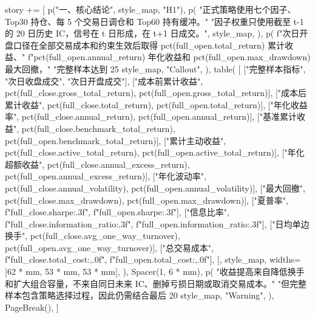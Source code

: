 \documentclass[UTF8,a4paper,fontset=fandol]{ctexart}
\begin{document}
\begin{ProjectCode}
    story += [
        p("一、核心结论", style_map, "H1"),
        p(
            "正式策略使用七个因子、Top30 持仓、每 5 个交易日调仓和 Top60 持有缓冲。"
            "因子权重只使用截至 t-1 的 20 日历史 IC，信号在 t 日形成，在 t+1 日成交。",
            style_map,
        ),
        p(
            f"次日开盘口径在全部交易成本和约束生效后取得 {pct(full_open.total_return)} 累计收益、"
            f"{pct(full_open.annual_return)} 年化收益和 {pct(full_open.max_drawdown)} 最大回撤，"
            "完整样本达到 25%
            style_map,
            "Callout",
        ),
        table(
            [
                ["完整样本指标", "次日收盘成交", "次日开盘成交"],
                ["成本前累计收益", pct(full_close.gross_total_return), pct(full_open.gross_total_return)],
                ["成本后累计收益", pct(full_close.total_return), pct(full_open.total_return)],
                ["年化收益率", pct(full_close.annual_return), pct(full_open.annual_return)],
                ["基准累计收益", pct(full_close.benchmark_total_return), pct(full_open.benchmark_total_return)],
                ["累计主动收益", pct(full_close.active_total_return), pct(full_open.active_total_return)],
                ["年化超额收益", pct(full_close.annual_excess_return), pct(full_open.annual_excess_return)],
                ["年化波动率", pct(full_close.annual_volatility), pct(full_open.annual_volatility)],
                ["最大回撤", pct(full_close.max_drawdown), pct(full_open.max_drawdown)],
                ["夏普率", f"{full_close.sharpe:.3f}", f"{full_open.sharpe:.3f}"],
                ["信息比率", f"{full_close.information_ratio:.3f}", f"{full_open.information_ratio:.3f}"],
                ["日均单边换手", pct(full_close.avg_one_way_turnover), pct(full_open.avg_one_way_turnover)],
                ["总交易成本", f"{full_close.total_cost:,.0f}", f"{full_open.total_cost:,.0f}"],
            ],
            style_map,
            widths=[62 * mm, 53 * mm, 53 * mm],
        ),
        Spacer(1, 6 * mm),
        p(
            "收益提高来自降低换手和扩大组合容量，不来自同日未来 IC、删掉亏损日期或取消交易成本。"
            "但完整样本包含策略选择过程，因此仍需结合最后 20%
            style_map,
            "Warning",
        ),
        PageBreak(),
    ]


\end{ProjectCode}
\end{document}
